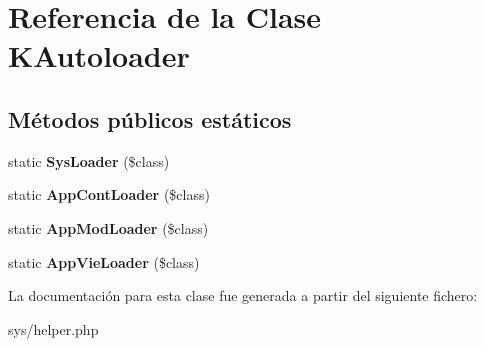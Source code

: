 \hypertarget{class_k_autoloader}{}\section{Referencia de la Clase K\+Autoloader}
\label{class_k_autoloader}
\subsection*{Métodos públicos estáticos}
\begin{DoxyCompactItemize}
\item 
\hypertarget{class_k_autoloader_a9c03232b28f4306eb55e5ae48d9b5a57}{}static {\bfseries Sys\+Loader} (\$class)\label{class_k_autoloader_a9c03232b28f4306eb55e5ae48d9b5a57}

\item 
\hypertarget{class_k_autoloader_ae9c99c78ae285712998aab4fcc0777bc}{}static {\bfseries App\+Cont\+Loader} (\$class)\label{class_k_autoloader_ae9c99c78ae285712998aab4fcc0777bc}

\item 
\hypertarget{class_k_autoloader_aa1675c8b9b03dc3c377ddfdbfef11b84}{}static {\bfseries App\+Mod\+Loader} (\$class)\label{class_k_autoloader_aa1675c8b9b03dc3c377ddfdbfef11b84}

\item 
\hypertarget{class_k_autoloader_a6a413fe01a5949ed9048dd7f50132488}{}static {\bfseries App\+Vie\+Loader} (\$class)\label{class_k_autoloader_a6a413fe01a5949ed9048dd7f50132488}

\end{DoxyCompactItemize}


La documentación para esta clase fue generada a partir del siguiente fichero\+:\begin{DoxyCompactItemize}
\item 
sys/helper.\+php\end{DoxyCompactItemize}
